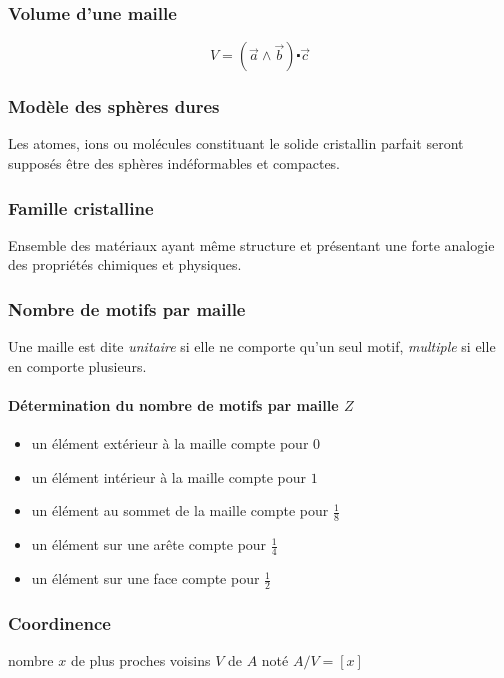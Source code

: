 \subsubsection{Volume d'une maille}
\begin{prop}
    \begin{equation}
        V = (\vec{a} \wedge \vec{b}) \centerdot \vec{c}
        \label{eq:volume}
    \end{equation}
\end{prop}

\subsubsection{Modèle des sphères dures}
Les atomes, ions ou molécules constituant le solide cristallin parfait seront
supposés être des sphères indéformables et compactes.

\subsubsection{Famille cristalline}
Ensemble des matériaux ayant même structure et présentant une forte analogie des
propriétés chimiques et physiques.

\subsubsection{Nombre de motifs par maille}
Une maille est dite \emph{unitaire} si elle ne comporte qu'un seul motif,
\emph{multiple} si elle en comporte plusieurs.
\paragraph{Détermination du nombre de motifs par maille $Z$}
\begin{itemize}
    \item un élément extérieur à la maille compte pour $0$
    \item un élément intérieur à la maille compte pour $1$
    \item un élément au sommet de la maille compte pour $\frac{1}{8}$
    \item un élément sur une arête compte pour $\frac{1}{4}$
    \item un élément sur une face compte pour $\frac{1}{2}$
\end{itemize}

\subsubsection{Coordinence}
\begin{defi}
    nombre $x$ de plus proches voisins $V$ de $A$ noté $A/V = [x]$
\end{defi}

